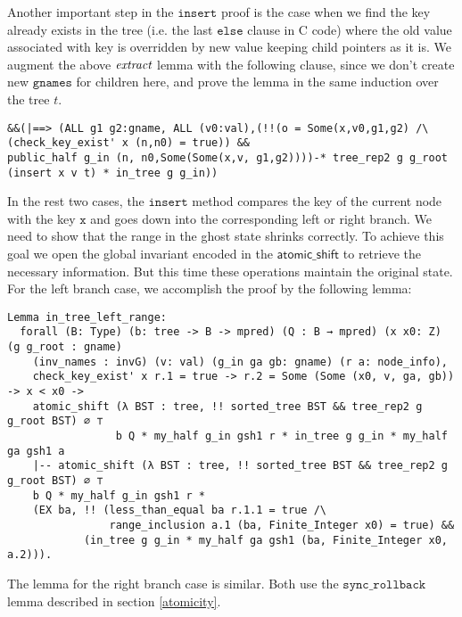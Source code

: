 \documentclass[acmsmall,screen]{acmart}\settopmatter{printfolios=true}
\begin{document}
Another important step in the $\texttt{insert}$ proof is the case when we find the key already exists in the tree (i.e. the last $\texttt{else}$ clause in C code) where the old value associated with key is overridden by new value keeping child pointers as it is. We augment the above $\emph{extract}$ lemma with the following clause, since we don't create new $\texttt{gnames}$ for children here, and prove the lemma in the same induction over the tree $t$.
\begin{verbatim}
&&(|==> (ALL g1 g2:gname, ALL (v0:val),(!!(o = Some(x,v0,g1,g2) /\ (check_key_exist' x (n,n0) = true)) && 
public_half g_in (n, n0,Some(Some(x,v, g1,g2))))-* tree_rep2 g g_root (insert x v t) * in_tree g g_in))
\end{verbatim}

In the rest two cases, the $\texttt{insert}$ method compares the key
of the current node with the key $\texttt{x}$ and goes down into the
corresponding left or right branch. We need to show that the range in
the ghost state shrinks correctly. To achieve this goal we open the
global invariant encoded in the $\mathsf{atomic\_shift}$ to retrieve
the necessary information. But this time these operations maintain the
original state. For the left branch case, we accomplish the proof by
the following lemma:
\begin{verbatim}
Lemma in_tree_left_range:
  forall (B: Type) (b: tree -> B -> mpred) (Q : B → mpred) (x x0: Z) (g g_root : gname)
    (inv_names : invG) (v: val) (g_in ga gb: gname) (r a: node_info),
    check_key_exist' x r.1 = true -> r.2 = Some (Some (x0, v, ga, gb)) -> x < x0 ->
    atomic_shift (λ BST : tree, !! sorted_tree BST && tree_rep2 g g_root BST) ∅ ⊤
                 b Q * my_half g_in gsh1 r * in_tree g g_in * my_half ga gsh1 a
    |-- atomic_shift (λ BST : tree, !! sorted_tree BST && tree_rep2 g g_root BST) ∅ ⊤
    b Q * my_half g_in gsh1 r *
    (EX ba, !! (less_than_equal ba r.1.1 = true /\
                range_inclusion a.1 (ba, Finite_Integer x0) = true) &&
            (in_tree g g_in * my_half ga gsh1 (ba, Finite_Integer x0, a.2))).  
\end{verbatim}
The lemma for the right branch case is similar. Both use the
$\texttt{sync\_rollback}$ lemma described in section \ref{atomicity}.
  
\end{document}
